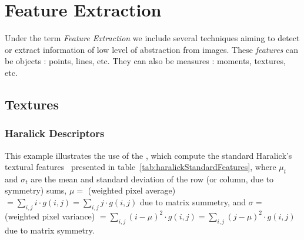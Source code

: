 \chapter{Feature Extraction}


Under the term {\em Feature Extraction} we include several techniques
aiming to detect or extract information of low level of abstraction
from images. These {\em features} can be objects : points, lines,
etc. They can also be measures : moments, textures, etc.

\section{Textures}
\subsection{Haralick Descriptors}

This example illustrates the use of the ,
which compute the standard Haralick's textural features~\cite{Haralick1973} presented in table~\ref{tab:haralickStandardFeatures},
where $\mu_t$ and $\sigma_t$ are the mean and standard deviation of the row
(or column, due to symmetry) sums, $ \mu =  $ (weighted pixel average)
$ = \sum_{i,j}i \cdot g(i, j) =\sum_{i,j}j \cdot g(i, j) $ due to matrix summetry, and
$ \sigma =  $ (weighted pixel variance) $ = \sum_{i,j}(i - \mu)^2 \cdot g(i, j) =\sum_{i,j}(j - \mu)^2 \cdot g(i, j)  $
due to matrix symmetry.

